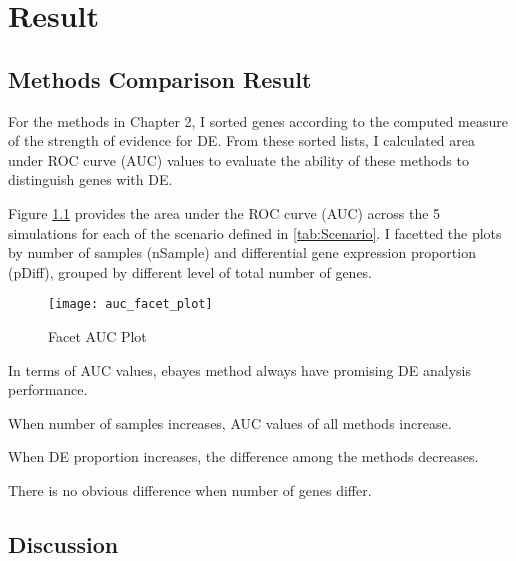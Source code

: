 \chapter{Result}

\section{Methods Comparison Result}

For the methods in Chapter 2, I sorted genes according to the computed measure of the strength of evidence for DE. From these sorted lists, I calculated area under ROC curve (AUC) values to evaluate the ability of these methods to distinguish genes with DE. 

Figure \ref{auc} provides the area under the ROC curve (AUC) across the 5 simulations for each of the scenario defined in \ref{tab:Scenario}. I facetted the plots by number of samples (nSample) and differential gene expression proportion (pDiff), grouped by different level of total number of genes. 

\begin{figure}[h!tb] 
\texttt{[image: auc\_facet\_plot]}
\caption{Facet AUC Plot}
\label{auc}
\end{figure}

In terms of AUC values, ebayes method always have promising DE analysis performance.

When number of samples increases, AUC values of all methods increase. 

When DE proportion increases, the difference among the methods decreases. 

There is no obvious difference when number of genes differ.


\section{Discussion}






